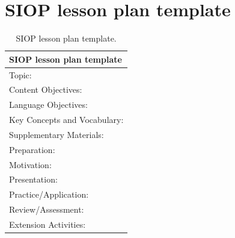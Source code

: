 \documentclass[english]{textolivre}
\begin{document}
\printbibliography\label{sec-bib}


\appendix
\section{SIOP lesson plan template}\label{appendix} 

\begin{table}[htbp]
\begin{threeparttable}
\caption{SIOP lesson plan template.}
\label{tab11}
\centering
\begin{tabular}{p{\textwidth}}
\toprule
SIOP lesson plan template   \\
\midrule
Topic: 
\vspace{7ex} \\
\midrule
Content Objectives: 
\vspace{7ex} \\
\midrule
Language Objectives: 
\vspace{7ex} \\
\midrule
Key Concepts and Vocabulary: 
\vspace{7ex} \\
\midrule
Supplementary Materials: 
\vspace{7ex} \\
\midrule
Preparation: 
\vspace{7ex} \\
\midrule
Motivation:
\vspace{7ex} \\
\midrule
Presentation: 
\vspace{7ex} \\
\midrule
Practice/Application: 
\vspace{7ex} \\
\midrule
Review/Assessment: 
\vspace{7ex} \\
\midrule
Extension Activities:
\vspace{7ex} \\
\bottomrule
\end{tabular}
\end{threeparttable}
\end{table}
\end{document}
